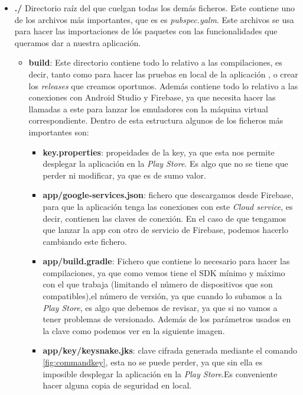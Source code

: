 \begin{itemize}
\item \textbf{./}
Directorio raíz del que cuelgan todas los demás ficheros. Este contiene uno de los archivos más importantes, que es es \emph{pubspec.yalm}. Este archivos se usa para hacer las importaciones de lós paquetes con las funcionalidades que queramos dar a nuestra aplicación.

\begin{itemize}
	\item \textbf{build}: Este directorio contiene todo lo relativo a las compilaciones, es decir, tanto como para hacer las pruebas en local de la aplicación , o crear los \emph{releases} que creamos oportunos. Además contiene todo lo relativo a las conexiones con Android Studio y Firebase, ya que necesita hacer las llamadas a este para lanzar los emuladores con la máquina virtual correspondiente. Dentro de esta estructura algunos de los ficheros más importantes son:
	\begin{itemize}
		\item \textbf{key.properties}: propeidades de la key, ya que esta nos permite desplegar la aplicación en la \emph{Play Store}. Es algo que no se tiene que perder ni modificar, ya que es de sumo valor. 
		\item \textbf{app/google-services.json}: fichero que descargamos desde Firebase, para que la aplicación tenga las conexiones con este \emph{Cloud service}, es decir, contienen las claves de conexión. En el caso de que tengamos que lanzar la app con otro de servicio de Firebase, podemos hacerlo cambiando este fichero.
		\item \textbf{app/build.gradle}: Fichero que contiene lo necesario para hacer las compilaciones, ya que como vemos tiene el SDK mínimo y máximo con el que trabaja (limitando el número de dispositivos que son compatibles),el número de versión, ya que cuando lo subamos a la \emph{Play Store}, es algo que debemos de revisar, ya que si no vamos a tener problemas de versionado. Además de los parámetros usados en la clave como podemos ver en la siguiente imagen.
		\item \textbf{app/key/keysnake.jks}: clave cifrada generada mediante el comando \ref{fig:commandkey}, esta no se puede perder, ya que sin ella es imposible desplegar la aplicación en la \emph{Play Store}.Es conveniente hacer alguna copia de seguridad en local.
		

\end{itemize}
\end{itemize}
\end{itemize}
